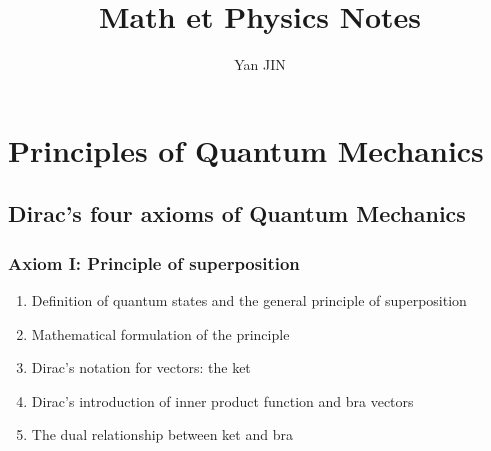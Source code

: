 \documentclass[12pt]{article}
\numberwithin{equation}{section}
\begin{document}
\small
    \title{Math et Physics Notes}
    \author{Yan JIN}
    \pagestyle{fancy}\fancyhf{}
    \lhead{}
    \lfoot{\textit{}}\cfoot{}\rfoot{\thepage}
    \renewcommand{\headrulewidth}{1.pt}
    \renewcommand{\footrulewidth}{1.pt}
  \maketitle
  \tableofcontents
\section{Principles of Quantum Mechanics}
\subsection{Dirac's four axioms of Quantum Mechanics}
\subsubsection{Axiom I: Principle of superposition}
\begin{enumerate}
\item Definition of quantum states and the general principle of superposition
\item Mathematical formulation of the principle
\item Dirac's notation for vectors: the ket
\item Dirac's introduction of inner product function and bra vectors
\item The dual relationship between ket and bra
\end{enumerate}
\end{document}
